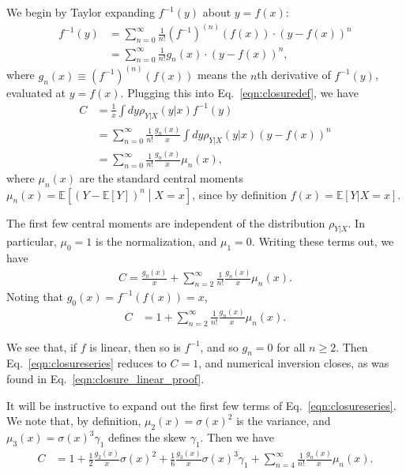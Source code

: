 We begin by Taylor expanding $f^{-1}(y)$ about $y=f(x)$:
\begin{align}
f^{-1}(y) &= \sum_{n=0}^\infty \frac{1}{n!}\left(f^{-1}\right)^{(n)}\left(f(x)\right)\cdot\left(y-f(x)\right)^n\nonumber\\
&=\sum_{n=0}^\infty \frac{1}{n!}g_n(x)\cdot\left(y-f(x)\right)^n,
\end{align}
where $g_n(x) \equiv (f^{-1})^{(n)}(f(x))$ means the $n$th derivative of $f^{-1}(y)$, evaluated at $y=f(x)$. Plugging this into Eq.~\ref{eqn:closuredef}, we have
\begin{align}
C &= \frac{1}{x}\int dy \rho_{Y|X}(y|x) f^{-1}(y)\nonumber\\
&=\sum_{n=0}^\infty \frac{1}{n!}\frac{g_n(x)}{x}\int dy \rho_{Y|X}(y|x) \left(y-f(x)\right)^n\nonumber\\
&=\sum_{n=0}^\infty \frac{1}{n!}\frac{g_n(x)}{x} \mu_n(x),
\end{align}
where $\mu_n(x)$ are the standard central moments $\mu_n(x) = \mathbb{E}\left[\left(Y-\mathbb{E}\left[Y\right]\right)^n\middle| X=x\right]$, since by definition $f(x)=\mathbb{E}[Y|X=x]$.

The first few central moments are independent of the distribution $\rho_{Y|X}$.  In particular, $\mu_0 = 1$ is the normalization, and $\mu_1 = 0$. Writing these terms out, we have
\begin{align}
C =\frac{g_0(x)}{x}+\sum_{n=2}^\infty \frac{1}{n!}\frac{g_n(x)}{x} \mu_n(x).
\end{align}
Noting that $g_0(x) = f^{-1}(f(x)) = x$,
\begin{align}
C &=1+\sum_{n=2}^\infty \frac{1}{n!}\frac{g_n(x)}{x} \mu_n(x).\label{eqn:closureseries}
\end{align}

\noindent We see that, if $f$ is linear, then so is $f^{-1}$, and so $g_n = 0$ for all $n\ge 2$. Then Eq.~\ref{eqn:closureseries} reduces to $C=1$, and numerical inversion closes, as was found in Eq.~\ref{eqn:closure_linear_proof}.

It will be instructive to expand out the first few terms of Eq.~\ref{eqn:closureseries}. We note that, by definition, $\mu_2(x) = \sigma(x)^2$ is the variance, and $\mu_3(x) = \sigma(x)^3\gamma_1$ defines the skew $\gamma_1$. Then we have
\begin{align}
C &=1+\frac{1}{2}\frac{g_2(x)}{x}\sigma(x)^2+\frac{1}{6}\frac{g_3(x)}{x}\sigma(x)^3\gamma_1+\sum_{n=4}^\infty \frac{1}{n!}\frac{g_n(x)}{x} \mu_n(x).\label{eqn:closureseriesexpand}
\end{align}

